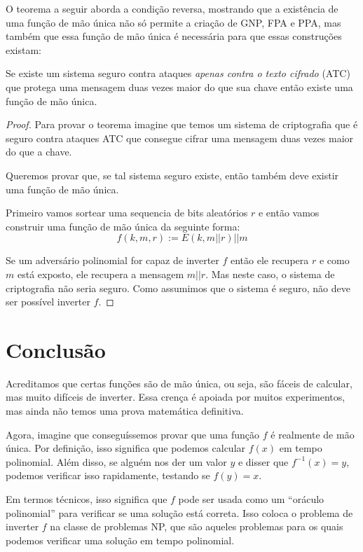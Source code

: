O teorema a seguir aborda a condição reversa, mostrando que a existência de uma função de mão única não só permite a criação de GNP, FPA e PPA, mas também que essa função de mão única é necessária para que essas construções existam:

\begin{theorem}
  Se existe um sistema seguro contra ataques {\em apenas contra o texto cifrado} (ATC) que protega uma mensagem duas vezes maior do que sua chave então existe uma função de mão única.
\end{theorem}
\begin{proof}
Para provar o teorema imagine que temos um sistema de criptografia que é seguro contra ataques ATC que consegue cifrar uma mensagem duas vezes maior do que a chave.

Queremos provar que, se tal sistema seguro existe, então também deve existir uma função de mão única.

Primeiro vamos sortear uma sequencia de bits aleatórios $r$ e então vamos construir uma função de mão única da seguinte forma:
\begin{displaymath}
  f(k, m, r) := E(k, m||r)||m
\end{displaymath}

Se um adversário polinomial for capaz de inverter $f$ então ele recupera $r$ e como $m$ está exposto, ele recupera a mensagem $m||r$.
Mas neste caso, o sistema de criptografia não seria seguro.
Como assumimos que o sistema é seguro, não deve ser possível inverter $f$.
\end{proof}

\section{Conclusão}

Acreditamos que certas funções são de mão única, ou seja, são fáceis de calcular, mas muito difíceis de inverter.
Essa crença é apoiada por muitos experimentos, mas ainda não temos uma prova matemática definitiva.

Agora, imagine que conseguíssemos provar que uma função $f$ é realmente de mão única.
Por definição, isso significa que podemos calcular $f(x)$ em tempo polinomial.
Além disso, se alguém nos der um valor $y$ e disser que $f^{-1}(x) = y$, podemos verificar isso rapidamente, testando se $f(y)=x$.

Em termos técnicos, isso significa que $f$ pode ser usada como um ``oráculo polinomial'' para verificar se uma solução está correta.
Isso coloca o problema de inverter $f$ na classe de problemas NP, que são aqueles problemas para os quais podemos verificar uma solução em tempo polinomial.

